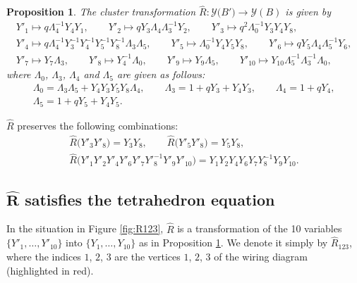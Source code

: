 \documentclass[11pt]{article}
\numberwithin{equation}{section}
\numberwithin{equation}{section}
\newtheorem{Proposition}[Theorem]{Proposition}
 { \theoremstyle{definition}
\newtheorem{Example}[Theorem]{Example}
\newtheorem{Remark}[Theorem]{Remark} }
\begin{document}
\begin{Proposition}\label{pr:RY}
The cluster transformation $\widehat{R}\colon \mathcal{Y}\bigl(B'\bigr) \rightarrow \mathcal{Y}(B)$ is given by
\begin{gather*}
Y'_1 \mapsto q\Lambda^{-1}_4Y_4Y_1,\qquad
Y'_2 \mapsto qY_3\Lambda_4\Lambda^{-1}_3Y_2,
\qquad
Y'_3 \mapsto q^2 \Lambda^{-1}_0Y_3Y_4Y_8,
\\
Y'_4 \mapsto q\Lambda^{-1}_4Y^{-1}_3Y^{-1}_4Y^{-1}_5Y^{-1}_8\Lambda_3\Lambda_5,
\qquad
Y'_5 \mapsto \Lambda^{-1}_0 Y_4Y_5Y_8,
\qquad
Y'_6 \mapsto q Y_5 \Lambda_4\Lambda^{-1}_5Y_6,
\\
Y'_7 \mapsto Y_7\Lambda_3,
\qquad
Y'_8 \mapsto Y^{-1}_4\Lambda_0,
\qquad
Y'_9 \mapsto Y_9\Lambda_5,
\qquad
Y'_{10} \mapsto Y_{10}\Lambda^{-1}_5\Lambda^{-1}_3\Lambda_0,
\end{gather*}
where $\Lambda_0$, $\Lambda_3$, $\Lambda_4$ and $\Lambda_5$ are given
as follows:
\begin{gather*}
\Lambda_0 = \Lambda_3\Lambda_5 + Y_4Y_3Y_5Y_8\Lambda_4,\qquad
\Lambda_3 = 1+qY_3+Y_4Y_3,\qquad
\Lambda_4 = 1 + q Y_4, \\
\Lambda_5 = 1+qY_5+Y_4Y_5.
\end{gather*}
\end{Proposition}

\begin{Remark}\label{re:c2}
$\widehat{R}$ preserves the following combinations:
\begin{gather*}
\widehat{R}\bigl(Y'_3Y'_8\bigr) = Y_3Y_8,
\qquad
\widehat{R}\bigl(Y'_5Y'_8\bigr) = Y_5Y_8,
\\
\widehat{R}\bigl(Y'_1Y'_2Y'_4Y'_6Y'_7Y'^{-1}_8Y'_9Y'_{10}\bigr) =
Y_1Y_2Y_4Y_6Y_7Y^{-1}_8Y_9Y_{10}.
\end{gather*}
\end{Remark}

\subsection[R satisfies the tetrahedron equation]{$\boldsymbol{\widehat{R}}$ satisfies the tetrahedron equation}

In the situation in Figure \ref{fig:R123}, $\widehat{R}$ is a
transformation of the 10 variables $\{Y'_1,\dotsc, Y'_{10}\}$ into
$\{Y_1,\dotsc, Y_{10}\}$ as in Proposition \ref{pr:RY}. We denote it
simply by $\widehat{R}_{123}$, where the indices $1$, $2$, $3$ are the
vertices $1$, $2$, $3$ of the wiring diagram (highlighted in red).
\end{document}
